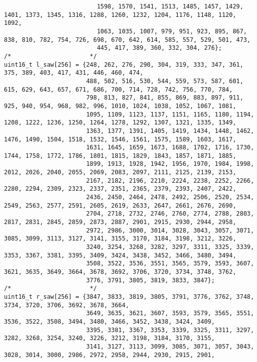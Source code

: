 \begin{code}
\begin{verbatim}
                          1598, 1570, 1541, 1513, 1485, 1457, 1429, 1401, 1373, 1345, 1316, 1288, 1260, 1232, 1204, 1176, 1148, 1120, 1092,
                          1063, 1035, 1007, 979, 951, 923, 895, 867, 838, 810, 782, 754, 726, 698, 670, 642, 614, 585, 557, 529, 501, 473,
                          445, 417, 389, 360, 332, 304, 276};
/*                      */
uint16_t l_saw[256] = {248, 262, 276, 290, 304, 319, 333, 347, 361, 375, 389, 403, 417, 431, 446, 460, 474,
                       488, 502, 516, 530, 544, 559, 573, 587, 601, 615, 629, 643, 657, 671, 686, 700, 714, 728, 742, 756, 770, 784,
                       798, 813, 827, 841, 855, 869, 883, 897, 911, 925, 940, 954, 968, 982, 996, 1010, 1024, 1038, 1052, 1067, 1081,
                       1095, 1109, 1123, 1137, 1151, 1165, 1180, 1194, 1208, 1222, 1236, 1250, 1264, 1278, 1292, 1307, 1321, 1335, 1349,
                       1363, 1377, 1391, 1405, 1419, 1434, 1448, 1462, 1476, 1490, 1504, 1518, 1532, 1546, 1561, 1575, 1589, 1603, 1617,
                       1631, 1645, 1659, 1673, 1688, 1702, 1716, 1730, 1744, 1758, 1772, 1786, 1801, 1815, 1829, 1843, 1857, 1871, 1885,
                       1899, 1913, 1928, 1942, 1956, 1970, 1984, 1998, 2012, 2026, 2040, 2055, 2069, 2083, 2097, 2111, 2125, 2139, 2153,
                       2167, 2182, 2196, 2210, 2224, 2238, 2252, 2266, 2280, 2294, 2309, 2323, 2337, 2351, 2365, 2379, 2393, 2407, 2422,
                       2436, 2450, 2464, 2478, 2492, 2506, 2520, 2534, 2549, 2563, 2577, 2591, 2605, 2619, 2633, 2647, 2661, 2676, 2690,
                       2704, 2718, 2732, 2746, 2760, 2774, 2788, 2803, 2817, 2831, 2845, 2859, 2873, 2887, 2901, 2915, 2930, 2944, 2958,
                       2972, 2986, 3000, 3014, 3028, 3043, 3057, 3071, 3085, 3099, 3113, 3127, 3141, 3155, 3170, 3184, 3198, 3212, 3226,
                       3240, 3254, 3268, 3282, 3297, 3311, 3325, 3339, 3353, 3367, 3381, 3395, 3409, 3424, 3438, 3452, 3466, 3480, 3494,
                       3508, 3522, 3536, 3551, 3565, 3579, 3593, 3607, 3621, 3635, 3649, 3664, 3678, 3692, 3706, 3720, 3734, 3748, 3762,
                       3776, 3791, 3805, 3819, 3833, 3847};
/*                      */
uint16_t r_saw[256] = {3847, 3833, 3819, 3805, 3791, 3776, 3762, 3748, 3734, 3720, 3706, 3692, 3678, 3664,
                       3649, 3635, 3621, 3607, 3593, 3579, 3565, 3551, 3536, 3522, 3508, 3494, 3480, 3466, 3452, 3438, 3424, 3409,
                       3395, 3381, 3367, 3353, 3339, 3325, 3311, 3297, 3282, 3268, 3254, 3240, 3226, 3212, 3198, 3184, 3170, 3155,
                       3141, 3127, 3113, 3099, 3085, 3071, 3057, 3043, 3028, 3014, 3000, 2986, 2972, 2958, 2944, 2930, 2915, 2901,

\end{verbatim}
\end{code}
